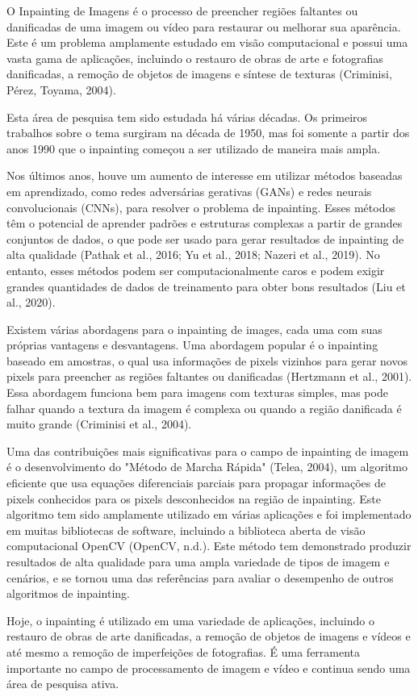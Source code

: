 
O Inpainting de Imagens é o processo de preencher regiões faltantes ou danificadas de uma imagem ou vídeo para restaurar ou melhorar sua aparência. Este é um problema amplamente estudado em visão computacional e possui uma vasta gama de aplicações, incluindo o restauro de obras de arte e fotografias danificadas, a remoção de objetos de imagens e síntese de texturas (Criminisi, Pérez, Toyama, 2004).

Esta área de pesquisa tem sido estudada há várias décadas. Os primeiros trabalhos sobre o tema surgiram na década de 1950, mas foi somente a partir dos anos 1990 que o inpainting começou a ser utilizado de maneira mais ampla.

Nos últimos anos, houve um aumento de interesse em utilizar métodos baseadas em aprendizado, como redes adversárias gerativas (GANs) e redes neurais convolucionais (CNNs), para resolver o problema de inpainting. Esses métodos têm o potencial de aprender padrões e estruturas complexas a partir de grandes conjuntos de dados, o que pode ser usado para gerar resultados de inpainting de alta qualidade (Pathak et al., 2016; Yu et al., 2018; Nazeri et al., 2019). No entanto, esses métodos podem ser computacionalmente caros e podem exigir grandes quantidades de dados de treinamento para obter bons resultados (Liu et al., 2020).

Existem várias abordagens para o inpainting de images, cada uma com suas próprias vantagens e desvantagens. Uma abordagem popular é o inpainting baseado em amostras, o qual usa informações de pixels vizinhos para gerar novos pixels para preencher as regiões faltantes ou danificadas (Hertzmann et al., 2001). Essa abordagem funciona bem para imagens com texturas simples, mas pode falhar quando a textura da imagem é complexa ou quando a região danificada é muito grande (Criminisi et al., 2004).

Uma das contribuições mais significativas para o campo de inpainting de imagem é o desenvolvimento do "Método de Marcha Rápida" (Telea, 2004), um algoritmo eficiente que usa equações diferenciais parciais para propagar informações de pixels conhecidos para os pixels desconhecidos na região de inpainting. Este algoritmo tem sido amplamente utilizado em várias aplicações e foi implementado em muitas bibliotecas de software, incluindo a biblioteca aberta de visão computacional OpenCV (OpenCV, n.d.). Este método tem demonstrado produzir resultados de alta qualidade para uma ampla variedade de tipos de imagem e cenários, e se tornou uma das referências para avaliar o desempenho de outros algoritmos de inpainting.

Hoje, o inpainting é utilizado em uma variedade de aplicações, incluindo o restauro de obras de arte danificadas, a remoção de objetos de imagens e vídeos e até mesmo a remoção de imperfeições de fotografias. É uma ferramenta importante no campo de processamento de imagem e vídeo e continua sendo uma área de pesquisa ativa.